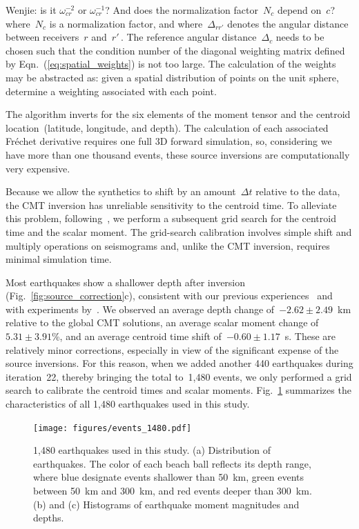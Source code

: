 \documentclass[extra,mreferee]{gji}
\begin{document}
{\color{Red} Wenjie: is it $\omega_{cr}^{-2}$ or $\omega_{cr}^{-1}$? And does the normalization factor~$N_c$ depend on~$c$?\\ }
where~$N_c$ is a normalization factor,
and where~$\Delta_{rr'}$ denotes the angular distance between receivers~$r$ and~$r'$\,.
The reference angular distance~$\Delta_c$ needs to be chosen such that the condition 
number of the diagonal weighting matrix defined by Eqn.~(\ref{eq:spatial_weights}) is not too large.
The calculation of the weights may be abstracted as: given a spatial distribution of
points on the unit sphere, determine a weighting associated with each point.

The algorithm inverts for the six elements of the moment tensor
and the centroid location~(latitude, longitude, and depth).
The calculation of each associated Fr\'echet derivative requires one full 3D forward simulation,
so, considering we have more than one thousand events,
these source inversions are computationally very expensive.

Because we allow the synthetics to shift by an amount~$\Delta t$ relative to the data,
the CMT inversion has unreliable sensitivity to the centroid time.
To alleviate this problem,
following~\cite{zhu2012structure},
we perform a subsequent grid search for the centroid time and the scalar moment.
The grid-search calibration involves simple shift and multiply operations on seismograms
and, unlike the CMT inversion, requires minimal simulation time.

Most earthquakes show a shallower depth after inversion
(Fig.~\ref{fig:source_correction}c),
consistent with our previous experiences~\citep[e.g.,][]{zhu2015seismic,chen2015multiparameter,bozdaug2016global} and with experiments by~\cite{hjorleifsdottir2010effects}.
We observed an average depth change of~$-2.62\pm2.49$~km relative to the global CMT solutions,
an average scalar moment change of~$5.31\pm3.91$\%,
and an average centroid time shift of~$-0.60\pm1.17$~s.
These are relatively minor corrections, especially in view of the significant expense of the source inversions.
For this reason, when we added another 440 earthquakes during iteration~22,
thereby bringing the total to~1,480 events,
we only performed a grid search to calibrate the centroid times and scalar moments.
Fig.~\ref{fig:event_1480} summarizes the characteristics of all 1,480 earthquakes used in this study.

\begin{figure}
  \centering
  \texttt{[image: figures/events\_1480.pdf]}
  \caption{1,480 earthquakes used in this study. (a) Distribution of earthquakes. The color of each beach ball reflects its depth range, where blue designate events shallower than 50~km, green events between 50~km and 300~km, and red events deeper than 300~km. (b) and (c) Histograms of earthquake moment magnitudes and depths.}
  \label{fig:event_1480}
\end{figure}
\end{document}
